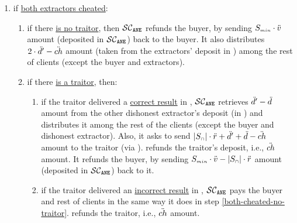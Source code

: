 \begin{itemize}[leftmargin=1.7mm]
\begin{enumerate}[leftmargin=4.3mm]
%
\item if \underline{both extractors cheated}:
%
\begin{enumerate}[leftmargin=2.5mm]
%
\item\label{both-cheated-no-traitor} if there \underline{is no traitor}, then $\mathcal{SC}_{\mathtt{ANE}}$ refunds the buyer, by sending $S_{\scriptscriptstyle min}\cdot \ddot{v}$ amount (deposited in $\mathcal{SC}_{\mathtt{ANE}}$) back to the buyer. It also distributes $2\cdot \ddot{d}'- \ddot{ch}$ amount (taken from the extractors' deposit in \SCpc) among the rest of  clients  (except the buyer and extractors). %
%
%
\item if there \underline{is a traitor}, then:
\begin{enumerate}
%
%
\item\label{both-cheated-honest-traitor} if the traitor delivered a \underline{correct result} in \SCtc, $\mathcal{SC}_{\mathtt{ANE}}$ retrieves $\ddot{d}'-\ddot{d}$ amount from the other dishonest extractor's deposit (in \SCpc) and distributes it among the rest of the clients (except the buyer and dishonest extractor). Also, it asks \SCpc to send $|S_{\scriptscriptstyle\cap}|\cdot \ddot{r}+\ddot{d}'+\ddot{d}-\ddot{ch}$ amount to the traitor (via \SCtc). %
%
\SCtc refunds the traitor's deposit, i.e., $\ddot{ch}$ amount. It refunds the buyer, by sending $S_{\scriptscriptstyle min}\cdot \ddot{v}-|S_{\scriptscriptstyle\cap}|\cdot \ddot{r}$ amount (deposited in $\mathcal{SC}_{\mathtt{ANE}}$) back to it.


%
\item if the traitor delivered an \underline{incorrect result} in \SCtc, $\mathcal{SC}_{\mathtt{ANE}}$ pays the buyer and rest of clients in the same way it does in step \ref{both-cheated-no-traitor}. 
%
%
%
\SCtc refunds the traitor, i.e., $\ddot{ch}$ amount.  %



\end{enumerate}
\end{enumerate}
\end{enumerate}
\end{itemize}
